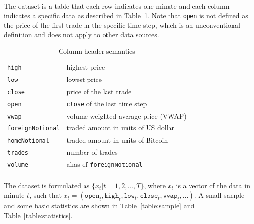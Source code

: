 \documentclass[12pt, letterpaper]{article}
\begin{document}
\paragraph{}
The dataset is a table that each row indicates one minute and each column indicates a specific data as described in Table~\ref{table:column-header}. Note that \texttt{open} is not defined as the price of the first trade in the specific time step, which is an unconventional definition and does not apply to other data sources.

\begin{table}
    \centering
    \begin{tabular}{ll}
        \toprule
        \texttt{high} & highest price \\
        \texttt{low} & lowest price \\
        \texttt{close} & price of the last trade \\
        \texttt{open} & \texttt{close} of the last time step \\
        \texttt{vwap} & volume-weighted average price (VWAP) \\
        \texttt{foreignNotional} & traded amount in units of US dollar \\
        \texttt{homeNotional} & traded amount in units of Bitcoin \\
        \texttt{trades} & number of trades \\
        \texttt{volume} & alias of \texttt{foreignNotional} \\
        \bottomrule
    \end{tabular}
    \caption{Column header semantics}%
    \label{table:column-header}
\end{table}

\paragraph{}
The dataset is formulated as \( \{x_t|t=1,2,\dots,T\} \), where \(x_t\) is a vector of the data in minute \(t\), such that \(x_t=(\mathtt{open}_t,\mathtt{high}_t,\mathtt{low}_t,\mathtt{close}_t,\mathtt{vwap}_t,\dots)\). A small sample and some basic statistics are shown in Table~\ref{table:sample} and Table~\ref{table:statistics}.
\end{document}
